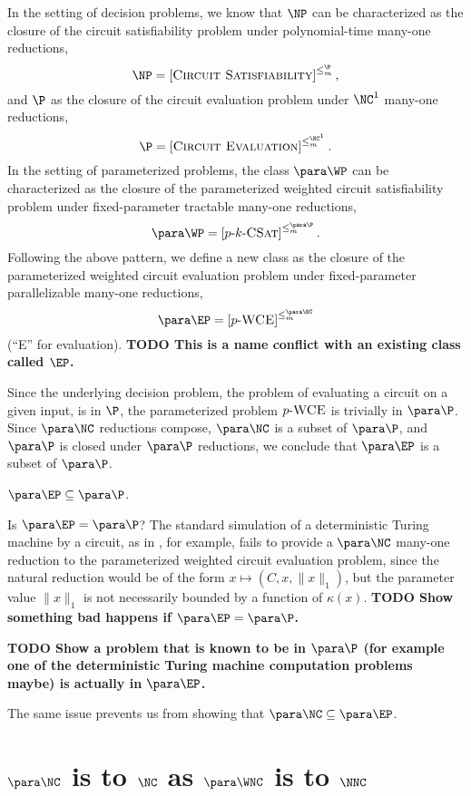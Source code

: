 \documentclass{article}
\newcommand{\todo}[1]{\textbf{TODO #1}}
\newcommand{\dash}{\textnormal{-}}
\newcommand{\pCkSAT}{p \dash k \dash \textsc{CSat}}
\newcommand{\pWCE}{p \dash \textsc{WCE}}
\newcommand{\cl}[1]{\left[{#1}\right]}
\begin{document}
In the setting of decision problems, we know that $\NP$ can be characterized as the closure of the circuit satisfiability problem under polynomial-time many-one reductions,
\[
\NP = \cl{\textsc{Circuit Satisfiability}}^{\leq_m^\P},
\]
and $\P$ as the closure of the circuit evaluation problem under $\NC^1$ many-one reductions,
\[
\P = \cl{\textsc{Circuit Evaluation}}^{\leq_m^{\NC^1}}.
\]
In the setting of parameterized problems, the class $\para \WP$ can be characterized as the closure of the parameterized weighted circuit satisfiability problem under fixed-parameter tractable many-one reductions,
\[
\para \WP = \cl{\pCkSAT}^{\leq_m^{\para \P}}.
\]
Following the above pattern, we define a new class as the closure of the parameterized weighted circuit evaluation problem under fixed-parameter parallelizable many-one reductions,
\[
\para \EP = \cl{\pWCE}^{\leq_m^{\para \NC}}
\]
(``E'' for evaluation).
\todo{This is a name conflict with an existing class called $\EP$.}

Since the underlying decision problem, the problem of evaluating a circuit on a given input, is in $\P$, the parameterized problem $\pWCE$ is trivially in $\para \P$.
Since $\para \NC$ reductions compose, $\para \NC$ is a subset of $\para \P$, and $\para \P$ is closed under $\para \P$ reductions, we conclude that $\para \EP$ is a subset of $\para \P$.

\begin{theorem}
  $\para \EP \subseteq \para \P$.
\end{theorem}

Is $\para \EP = \para \P$?
The standard simulation of a deterministic Turing machine by a circuit, as in \autocite{ladner75}, for example, fails to provide a $\para \NC$ many-one reduction to the parameterized weighted circuit evaluation problem, since the natural reduction would be of the form $x \mapsto (C, x, \|x\|_1)$, but the parameter value $\|x\|_1$ is not necessarily bounded by a function of $\kappa(x)$.
\todo{Show something bad happens if $\para \EP = \para \P$.}

\todo{Show a problem that is known to be in $\para \P$ (for example one of the deterministic Turing machine computation problems maybe) is actually in $\para \EP$.}

The same issue prevents us from showing that $\para \NC \subseteq \para \EP$.

\section{\texorpdfstring{$\para \NC$}{paraNC} is to \texorpdfstring{$\NC$}{NC} as \texorpdfstring{$\para \WNC$}{paraWNC} is to \texorpdfstring{$\NNC$}{NNC}}
\end{document}
